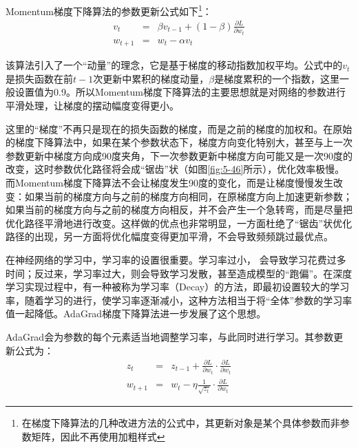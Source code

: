 \parinterval  Momentum梯度下降算法的参数更新公式如下\footnote{在梯度下降算法的几种改进方法的公式中，其更新对象是某个具体参数而非参数矩阵，因此不再使用加粗样式}：
\begin{eqnarray}
v_t&=&\beta v_{t-1}+(1-\beta)\frac{\partial L}{\partial w_t}\label{eq:5-34}\\
w_{t+1}&=&w_t-\alpha v_t
\label{eq:5-35}
\end{eqnarray}

\parinterval  该算法引入了一个``动量''的理念\cite{qian1999momentum}，它是基于梯度的移动指数加权平均。公式中的$ v_t $是损失函数在前$ t-1 $次更新中累积的梯度动量，$ \beta $是梯度累积的一个指数，这里一般设置值为0.9。所以Momentum梯度下降算法的主要思想就是对网络的参数进行平滑处理，让梯度的摆动幅度变得更小。

\parinterval  这里的``梯度''不再只是现在的损失函数的梯度，而是之前的梯度的加权和。在原始的梯度下降算法中，如果在某个参数状态下，梯度方向变化特别大，甚至与上一次参数更新中梯度方向成90度夹角，下一次参数更新中梯度方向可能又是一次90度的改变，这时参数优化路径将会成``锯齿''状（如图\ref{fig:5-46}所示），优化效率极慢。而Momentum梯度下降算法不会让梯度发生90度的变化，而是让梯度慢慢发生改变：如果当前的梯度方向与之前的梯度方向相同，在原梯度方向上加速更新参数；如果当前的梯度方向与之前的梯度方向相反，并不会产生一个急转弯，而是尽量把优化路径平滑地进行改变。这样做的优点也非常明显，一方面杜绝了``锯齿''状优化路径的出现，另一方面将优化幅度变得更加平滑，不会导致频频跳过最优点。

%

\vspace{0.5em}
\vspace{0.5em}

\parinterval  在神经网络的学习中，学习率的设置很重要。学习率过小， 会导致学习花费过多时间；反过来，学习率过大，则会导致学习发散，甚至造成模型的``跑偏''。在深度学习实现过程中，有一种被称为学习率{\small{}}（Decay）的方法，即最初设置较大的学习率，随着学习的进行，使学习率逐渐减小，这种方法相当于将``全体''参数的学习率值一起降低。AdaGrad梯度下降算法进一步发展了这个思想\cite{duchi2011adaptive}。

\parinterval  AdaGrad会为参数的每个元素适当地调整学习率，与此同时进行学习。其参数更新公式为：
\begin{eqnarray}
z_t&=&z_{t-1}+\frac{\partial L}{\partial w_t} \cdot  \frac{\partial L}{\partial w_t}\label{eq:5-36}\\
w_{t+1}&=&w_t-\eta \frac{1}{\sqrt{z_t}}\cdot \frac{\partial L}{\partial w_t}
\label{eq:5-37}
\end{eqnarray}

